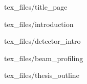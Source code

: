 \documentclass[a4paper,10pt]{article}
\begin{document}
{tex_files/title_page}
\clearpage

{}
\newpage
{}
\setcounter{page}{2}

{tex_files/introduction}

{tex_files/detector_intro}

{tex_files/beam_profiling}

{tex_files/thesis_outline}
\end{document}
